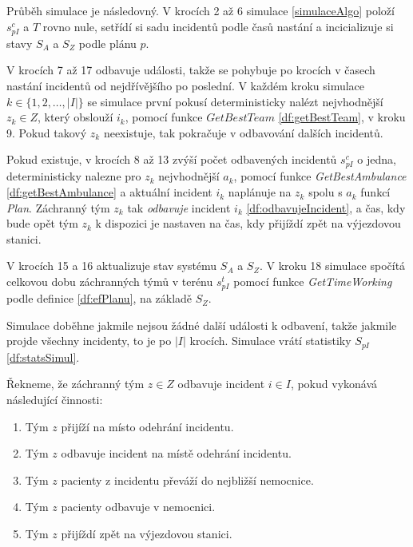 \vspace*{10px}

Průběh simulace je následovný. 
V krocích 2 až 6 simulace \ref{simulaceAlgo} položí $s^{c}_{pI}$ a $T$ rovno nule, setřídí si sadu incidentů podle časů nastání
a incicializuje si stavy $S_A$ a $S_Z$ podle plánu $p$.

V krocích 7 až 17 odbavuje události, takže se pohybuje po krocích v časech nastání incidentů od nejdřívějšího po poslední.
V každém kroku simulace $k \in \{ 1, 2, \dots , |I|\}$ se simulace první pokusí deterministicky nalézt nejvhodnější $z_k \in Z$, který obslouží $i_k$,
pomocí funkce $\textit{GetBestTeam}$ \ref{df:getBestTeam}, v kroku 9. 
Pokud takový $z_k$ neexistuje, tak pokračuje v odbavování dalších incidentů.

Pokud existuje, v krocích 8 až 13 zvýší počet odbavených incidentů $s^c_{pI}$ o jedna,
deterministicky nalezne pro $z_k$ nejvhodnější $a_k$, pomocí funkce \textit{GetBestAmbulance} \ref{df:getBestAmbulance} a
aktuální incident $i_k$ naplánuje na $z_k$ spolu s $a_k$ funkcí \textit{Plan}.
Záchranný tým $z_k$ tak \textit{odbavuje} incident $i_k$ \ref{df:odbavujeIncident}, a čas, kdy bude opět tým $z_k$ k dispozici je nastaven na čas, kdy přijíždí zpět na výjezdovou stanici.

V krocích 15 a 16 aktualizuje stav systému $S_A$ a $S_Z$.
V kroku 18 simulace spočítá celkovou dobu záchranných týmů v terénu $s^t_{pI}$ pomocí funkce \textit{GetTimeWorking} podle definice \ref{df:efPlanu}, na základě $S_Z$.

Simulace doběhne jakmile nejsou žádné další události k odbavení, takže jakmile projde všechny incidenty, to je po $|I|$ krocích.
Simulace vrátí statistiky $S_{pI}$ \ref{df:statsSimul}.

\begin{definice}\label{df:odbavujeIncident}
  Řekneme, že záchranný tým $z \in Z$ odbavuje incident $i \in I$, pokud vykonává následující činnosti:
  \begin{enumerate}
    \item
      Tým $z$ přijíží na místo odehrání incidentu.

    \item
      Tým $z$ odbavuje incident na místě odehrání incidentu.

    \item
      Tým $z$ pacienty z incidentu převáží do nejbližší nemocnice.

    \item
      Tým $z$ pacienty odbavuje v nemocnici.

    \item
      Tým $z$ přijíždí zpět na výjezdovou stanici.
  \end{enumerate}
\end{definice}

